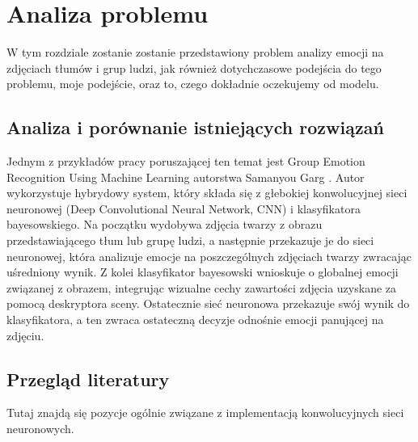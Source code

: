 \chapter{Analiza problemu}
\thispagestyle{chapterBeginStyle}
\label{rozdzial1}

W tym rozdziale zostanie zostanie przedstawiony problem analizy emocji na zdjęciach tłumów i grup ludzi, jak również dotychczasowe podejścia do tego problemu, moje podejście, oraz to, czego dokładnie oczekujemy od modelu.



\section{Analiza i porównanie istniejących rozwiązań}
Jednym z przykładów pracy poruszającej ten temat jest Group Emotion Recognition Using Machine Learning autorstwa Samanyou Garg \cite{SGarg}. Autor wykorzystuje hybrydowy system, który składa się z głebokiej konwolucyjnej sieci neuronowej (Deep Convolutional Neural Network, CNN) i klasyfikatora bayesowskiego. Na początku wydobywa zdjęcia twarzy z obrazu przedstawiającego tłum lub grupę ludzi, a następnie przekazuje je do sieci neuronowej, która analizuje emocje na poszczególnych zdjęciach twarzy zwracając uśredniony wynik. Z kolei klasyfikator bayesowski wnioskuje o globalnej emocji związanej z obrazem, integrując wizualne cechy zawartości zdjęcia uzyskane za pomocą deskryptora sceny. Ostatecznie sieć neuronowa przekazuje swój wynik do klasyfikatora, a ten zwraca ostateczną decyzje odnośnie emocji panującej na zdjęciu.

\section{Przegląd literatury}
Tutaj znajdą się pozycje ogólnie związane z implementacją konwolucyjnych sieci neuronowych.
